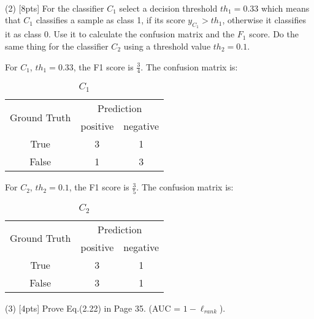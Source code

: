 	\\

	
	
	(2) [8pts] For the classifier $C_1$ select a decision threshold $th_1 = 0.33$ which means that $C_1$ classifies a sample as class 1, if its score $y_{C_1} > th_1$, otherwise it classifies it as class 0. Use it to calculate the confusion matrix and the $F_1$ score. Do the same thing for the classifier $C_2$ using a threshold value $th_2 = 0.1$.\\

	\begin{solution}
		For $C_1$, $th_1=0.33$, the F1 score is $\frac{3}{4}$. The confusion matrix is:
		\begin{table}[htbp]
			\centering
			\begin{tabular}{|c|c|c|}
				\hline
				\multirow{2}{*}{Ground Truth} & \multicolumn{2}{c|}{Prediction} \\ \cline{2-3}
				 & positive & negative \\ \hline
				True & 3 & 1 \\ \hline
				False & 1 & 3 \\ \hline
			\end{tabular}
			\caption{$C_1$}
		\end{table}

		For $C_2$, $th_2=0.1$, the F1 score is $\frac{3}{5}$. The confusion matrix is:
		\begin{table}[htbp]
			\centering
			\begin{tabular}{|c|c|c|}
				\hline
				\multirow{2}{*}{Ground Truth} & \multicolumn{2}{c|}{Prediction} \\ \cline{2-3}
				 & positive & negative \\ \hline
				True & 3 & 1 \\ \hline
				False & 3 & 1 \\ \hline
			\end{tabular}
			\caption{$C_2$}
		\end{table}
	\end{solution}

	(3) [4pts] Prove Eq.(2.22) in Page 35. (AUC = $1 - \ell_{rank}$).

